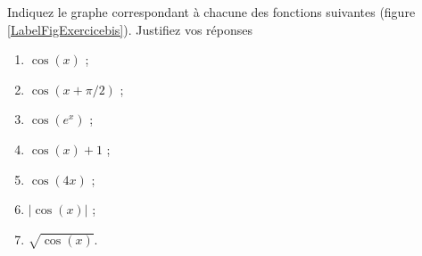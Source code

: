 
\begin{exercice}\label{exoDS2010bis-0002}

	Indiquez le graphe correspondant à chacune des fonctions suivantes (figure \ref{LabelFigExercicebis}). Justifiez vos réponses
\begin{multicols}{3}
  \begin{enumerate}
  \item $\cos (x) $ ;
  \item $\cos (x+\pi/2) $ ;
  \item $\cos(e^x) $ ;
  \item $ \cos(x)+1$ ;
  \item $\cos (4x) $ ; 
  \item $ |\cos(x)|$ ;
  \item $ \sqrt{\cos(x)}$.
  \end{enumerate}
\end{multicols}

\newcommand{\CaptionFigExercicebis}{Les graphes à considérer de la question \ref{exoDS2010bis-0002}.} 


\end{exercice}
